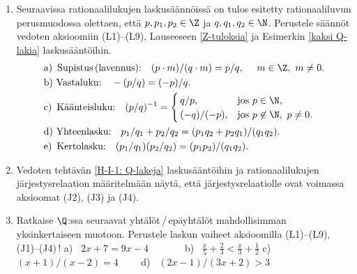 \begin{enumerate}
\item  \label{H-I-1: Q-lakeja} %
Seuraavissa rationaalilukujen laskusäännöissä on tulos esitetty rationaaliluvun perusmuodossa
olettaen, että $p,p_1,p_2\in\Z$ ja $q,q_1,q_2\in\N$. Perustele säännöt vedoten aksioomiin
(L1)--(L9), Lauseeseen \ref{Z-tuloksia} ja Esimerkin \ref{kaksi Q-lakia} laskusääntöihin.
\begin{align*}
&\text{a) \,Supistus\,(lavennus):} \quad (p \cdot m)/(q \cdot m) = p/q, 
                    \              \quad m\in\Z,\ m\neq 0. \\
&\text{b)   Vastaluku:} \quad -(p/q) = (-p)/q. \\
&\text{c) \,Käänteisluku:} \quad (p/q)^{-1} = \begin{cases}
                                              \,q/p,       &\text{jos}\ p\in\N, \\
                                              \,(-q)/(-p), &\text{jos}\ p\not\in\N,\ p \neq 0.
                                              \end{cases} \\
&\text{d)   Yhteenlasku:} \quad p_1/q_1+p_2/q_2 = (p_1q_2+p_2q_1)/(q_1q_2). \\
&\text{e) \,Kertolasku:} \quad (p_1/q_1)(p_2/q_2) = (p_1p_2)/(q_1q_2).
\end{align*}

\item \label{H-I-1: Q-järjestys}
Vedoten tehtävän \ref{H-I-1: Q-lakeja} laskusääntöihin ja rationaalilukujen järjestysrelaation
määritelmään näytä, että järjestysrelaatiolle ovat voimassa aksioomat (J2), (J3) ja (J4). 

\item
Ratkaise $\Q$:ssa seuraavat yhtälöt\,/\,epäyhtälöt mahdollisimman yksinkertaiseen muotoon. 
Perustele laskun vaiheet aksioomilla (L1)--(L9), (J1)--(J4)\,! \vspace{1mm}\newline
a) \ $2x+7=9x-4 \qquad\quad\,\ $
b) \ $\tfrac{x}{5}+\tfrac{2}{3}<\tfrac{x}{3}+\tfrac{1}{2}$ \newline
c) \ $(x+1)/(x-2)=4 \qquad$
d) \ $(2x-1)/(3x+2)>3$


\end{enumerate}
